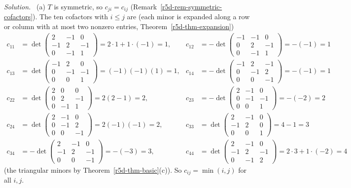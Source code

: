 \documentclass[12pt]{article}
\theoremstyle{definition}
\newenvironment{solution}{\par\noindent\textit{Solution.}\ }{\par\smallskip}
\begin{document}
\begin{solution}
(a) \(T\) is symmetric, so \(c_{ji}=c_{ij}\) (Remark~\ref{r5d-rem-symmetric-cofactors}). The ten cofactors with \(i\leqslant j\) are (each minor is expanded along a row or
column with at most two nonzero entries, Theorem~\ref{r5d-thm-expansion})
\[
\begin{aligned}
c_{11}&=\det\left(\begin{smallmatrix}2&-1&0\\-1&2&-1\\0&-1&1\end{smallmatrix}\right)=2\cdot1+1\cdot(-1)=1,&
c_{12}&=-\det\left(\begin{smallmatrix}-1&-1&0\\0&2&-1\\0&-1&1\end{smallmatrix}\right)=-(-1)=1\\
c_{13}&=\det\left(\begin{smallmatrix}-1&2&0\\0&-1&-1\\0&0&1\end{smallmatrix}\right)=(-1)(-1)(1)=1,&
c_{14}&=-\det\left(\begin{smallmatrix}-1&2&-1\\0&-1&2\\0&0&-1\end{smallmatrix}\right)=-(-1)=1\\
c_{22}&=\det\left(\begin{smallmatrix}2&0&0\\0&2&-1\\0&-1&1\end{smallmatrix}\right)=2(2-1)=2,&
c_{23}&=-\det\left(\begin{smallmatrix}2&-1&0\\0&-1&-1\\0&0&1\end{smallmatrix}\right)=-(-2)=2\\
c_{24}&=\det\left(\begin{smallmatrix}2&-1&0\\0&-1&2\\0&0&-1\end{smallmatrix}\right)=2(-1)(-1)=2,&
c_{33}&=\det\left(\begin{smallmatrix}2&-1&0\\-1&2&0\\0&0&1\end{smallmatrix}\right)=4-1=3\\
c_{34}&=-\det\left(\begin{smallmatrix}2&-1&0\\-1&2&-1\\0&0&-1\end{smallmatrix}\right)=-(-3)=3,&
c_{44}&=\det\left(\begin{smallmatrix}2&-1&0\\-1&2&-1\\0&-1&2\end{smallmatrix}\right)=2\cdot3+1\cdot(-2)=4
\end{aligned}
\]
(the triangular minors by Theorem~\ref{r5d-thm-basic}(c)). So \(c_{ij}=\min(i,j)\) for all
\(i,j\).


\end{solution}
\end{document}
